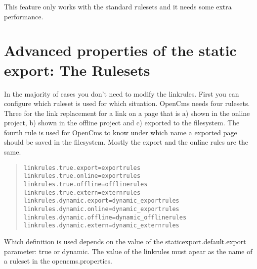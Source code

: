 This feature only works with the standard rulesets and it needs some extra performance.

\section{Advanced properties of the static export: The Rulesets}

In the majority of cases you don't need to modify the linkrules. 
First you can configure which ruleset is used for which situation. OpenCms needs four rulesets. Three for the link replacement for a link on a page that is a) shown in the online project, b) shown in the offline project and c) exported to the filesystem. The fourth rule is used for OpenCms to know under which name a exported page should be saved in the filesystem. Mostly the export and the online rules are the same. 

\begin{quote}
\begin{verbatim}
linkrules.true.export=exportrules
linkrules.true.online=exportrules
linkrules.true.offline=offlinerules
linkrules.true.extern=externrules
linkrules.dynamic.export=dynamic_exportrules
linkrules.dynamic.online=dynamic_exportrules
linkrules.dynamic.offline=dynamic_offlinerules
linkrules.dynamic.extern=dynamic_externrules
\end{verbatim}
\end{quote}

Which definition is used depends on the value of the staticexport.default.export parameter: true or dynamic. The value of the linkrules must apear as the name of a ruleset in the opencms.properties. 

